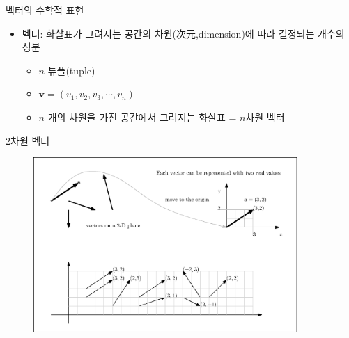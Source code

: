 \documentclass{beamer}
\begin{document}
\begin{frame}{벡터의 수학적 표현}

\begin{itemize}
\item 벡터: 화살표가 그려지는 공간의 차원(次元,dimension)에 따라 결정되는 개수의 성분
	\begin{itemize}
	\item $n$-튜플(tuple)
	\item $\mathbf v = ( v_1 , v_2 , v_3, \cdots , v_n )$
	\item $n$ 개의 차원을 가진 공간에서 그려지는 화살표 = $n$차원 벡터
	\end{itemize}
\end{itemize}

\end{frame}


\begin{frame}{2차원 벡터}

\begin{figure}[h!]
\includegraphics[width=10cm]{Math_vector/2dVectors.eps}
\end{figure}
\end{frame}
\end{document}
